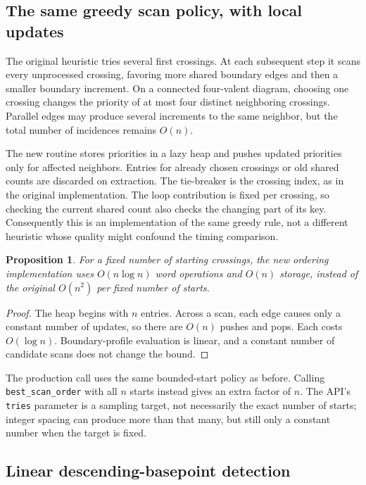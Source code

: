 \documentclass[11pt,letterpaper]{article}
\newtheorem{proposition}[theorem]{Proposition}
\theoremstyle{definition}
\begin{document}
\subsection{The same greedy scan policy, with local updates}

The original heuristic tries several first crossings. At each subsequent step
it scans every unprocessed crossing, favoring more shared boundary edges and
then a smaller boundary increment. On a connected four-valent diagram, choosing
one crossing changes the priority of at most four distinct neighboring
crossings. Parallel edges may produce several increments to the same neighbor,
but the total number of incidences remains $O(n)$.

The new routine stores priorities in a lazy heap and pushes updated priorities
only for affected neighbors. Entries for already chosen crossings or old shared
counts are discarded on extraction. The tie-breaker is the crossing index, as
in the original implementation. The loop contribution is fixed per crossing,
so checking the current shared count also checks the changing part of its key.
Consequently this is an implementation of the same greedy rule, not a different
heuristic whose quality might confound the timing comparison.

\begin{proposition}
For a fixed number of starting crossings, the new ordering implementation uses
$O(n\log n)$ word operations and $O(n)$ storage, instead of the original
$O(n^2)$ per fixed number of starts.
\end{proposition}
\begin{proof}
The heap begins with $n$ entries. Across a scan, each edge causes only a
constant number of updates, so there are $O(n)$ pushes and pops. Each costs
$O(\log n)$. Boundary-profile evaluation is linear, and a constant number of
candidate scans does not change the bound.
\end{proof}

The production call uses the same bounded-start policy as before. Calling
\texttt{best\_scan\_order} with all $n$ starts instead gives an extra factor of
$n$. The API's \texttt{tries} parameter is a sampling target, not necessarily the
exact number of starts; integer spacing can produce more than that many, but
still only a constant number when the target is fixed.

\subsection{Linear descending-basepoint detection}
\end{document}
